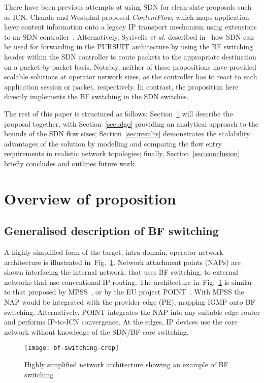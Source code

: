 \documentclass[conference]{IEEEtran}
\newcommand{\figref}[1]{Fig.~\ref{#1}}
\begin{document}
There have been previous attempts at using SDN for clean-slate proposals such as ICN. Chanda and Westphal proposed \emph{ContentFlow}, which maps application layer content information onto a legacy IP transport mechanism using extensions to an SDN controller~\cite{Chanda2013}. Alternatively, Syrivelis \emph{et al.} described in~\cite{Syrivelis2012} how SDN can be used for forwarding in the PURSUIT architecture by using the BF switching header within the SDN controller to route packets to the appropriate destination on a packet-by-packet basis. Notably, neither of these propositions have provided scalable solutions at operator network sizes, as the controller has to react to each application session or packet, respectively. In contrast, the proposition here directly implements the BF switching in the SDN switches. 

The rest of this paper is structured as follows: Section~\ref{sec:proposition} will describe the proposal together, with Section~\ref{sec:algo} providing an analytical approach to the bounds of the SDN flow sizes; Section~\ref{sec:results} demonstrates the scalability advantages of the solution by modelling and comparing the flow entry requirements in realistic network topologies; finally, Section~\ref{sec:conclusion} briefly concludes and outlines future work.

\section{Overview of proposition}
\label{sec:proposition}

\subsection{Generalised description of BF switching}
\label{sec:bf-switching}

A highly simplified form of the target, intra-domain, operator network architecture is illustrated in~\figref{fig:arch}. Network attachment points (NAPs) are shown interfacing the internal network, that uses BF switching, to external networks that use conventional IP routing. The architecture in~\figref{fig:arch} is similar to that proposed by MPSS~\cite{Zahemszky2010}, or by the EU project POINT~\cite{Trossen2015}. With MPSS the NAP would be integrated with the provider edge (PE), mapping IGMP onto BF switching. Alternatively, POINT integrates the NAP into any suitable edge router and performs IP-to-ICN convergence. At the edges, IP devices use the core network without knowledge of the SDN/BF core switching. 
\begin{figure}[tb]
  \centering
  \texttt{[image: bf-switching-crop]}
  \caption{Highly simplified network architecture showing an example of BF switching}
  \label{fig:arch}
\end{figure}
\end{document}
